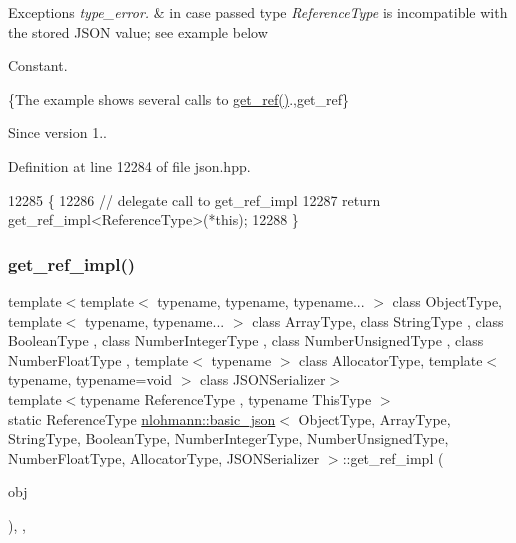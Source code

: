 \begin{DoxyExceptions}{Exceptions}
{\em type\+\_\+error.} & in case passed type {\itshape Reference\+Type} is incompatible with the stored J\+S\+ON value; see example below\\
\hline
\end{DoxyExceptions}
Constant.

\{The example shows several calls to {\ttfamily \hyperlink{classnlohmann_1_1basic__json_afbd800010b67619463c0fce6e74f7878}{get\+\_\+ref()}}.,get\+\_\+ref\}

\begin{DoxySince}{Since}
version 1.. 
\end{DoxySince}


Definition at line 12284 of file json.\+hpp.


\begin{DoxyCode}
12285     \{
12286         \textcolor{comment}{// delegate call to get\_ref\_impl}
12287         \textcolor{keywordflow}{return} get\_ref\_impl<ReferenceType>(*this);
12288     \}
\end{DoxyCode}
\mbox{\label{classnlohmann_1_1basic__json_a040a5feb1eb48da9134924217b25bcf6}} 
\subsubsection{\texorpdfstring{get\+\_\+ref\+\_\+impl()}{get\_ref\_impl()}}
{\footnotesize\ttfamily template$<$template$<$ typename, typename, typename... $>$ class Object\+Type, template$<$ typename, typename... $>$ class Array\+Type, class String\+Type , class Boolean\+Type , class Number\+Integer\+Type , class Number\+Unsigned\+Type , class Number\+Float\+Type , template$<$ typename $>$ class Allocator\+Type, template$<$ typename, typename=void $>$ class J\+S\+O\+N\+Serializer$>$ \\
template$<$typename Reference\+Type , typename This\+Type $>$ \\
static Reference\+Type \hyperlink{classnlohmann_1_1basic__json}{nlohmann\+::basic\+\_\+json}$<$ Object\+Type, Array\+Type, String\+Type, Boolean\+Type, Number\+Integer\+Type, Number\+Unsigned\+Type, Number\+Float\+Type, Allocator\+Type, J\+S\+O\+N\+Serializer $>$\+::get\+\_\+ref\+\_\+impl (\begin{DoxyParamCaption}\item[{This\+Type \&}]{obj }\end{DoxyParamCaption})\hspace{0.3cm}{\ttfamily [inline]}, {\ttfamily [static]}, {\ttfamily [private]}}



